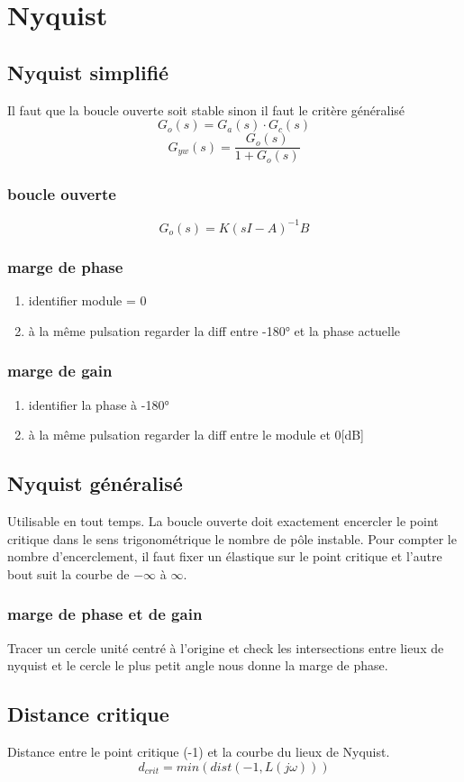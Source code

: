 \documentclass[resume]{subfiles}
\begin{document}
\section{Nyquist}

\subsection{Nyquist simplifié}
Il faut que la boucle ouverte soit stable sinon il faut le critère généralisé
$$G_o(s) = G_a(s)\cdot G_c(s)$$
$$G_{yw}(s)=\frac{G_o(s)}{1+G_o(s)}$$

\subsubsection{boucle ouverte}
$$G_o(s) = K(sI - A)^{-1}B$$

\subsubsection{marge de phase}
\begin{enumerate}
\item identifier module = 0
\item à la même pulsation regarder la diff entre -180° et la phase actuelle
\end{enumerate}

\subsubsection{marge de gain}
\begin{enumerate}
\item identifier la phase à -180°
\item à la même pulsation regarder la diff entre le module et 0[dB]
\end{enumerate}

\subsection{Nyquist généralisé}
Utilisable en tout temps. La boucle ouverte doit exactement encercler le point critique dans le sens trigonométrique le nombre de pôle instable.
Pour compter le nombre d'encerclement, il faut fixer un élastique sur le point critique et l'autre bout suit la courbe de $-\infty$ à $\infty$. 

\subsubsection{marge de phase et de gain}
Tracer un cercle unité centré à l'origine et check les intersections entre lieux de nyquist et le cercle le plus petit angle nous donne la marge de phase.


\subsection{Distance critique}
Distance entre le point critique (-1) et la courbe du lieux de Nyquist.
$$d_{crit} = min(dist(-1,L(j\omega)))$$
\end{document}
